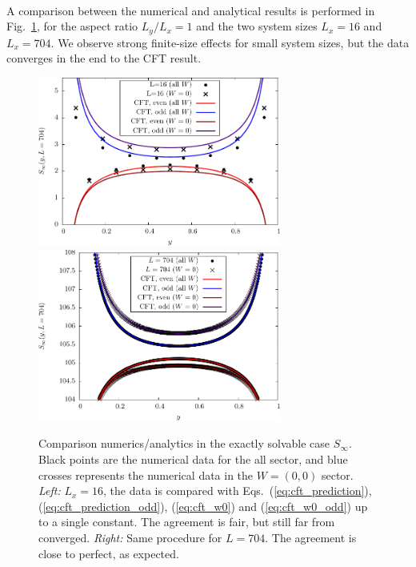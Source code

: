 \documentclass[11pt]{iopart}
\begin{document}
\paragraph{}
A comparison between the numerical and analytical results is performed in Fig.~\ref{fig:Sinfty}, for the aspect ratio $L_y/L_x=1$ and the two system sizes $L_x=16$ and $L_x=704$. We observe strong finite-size effects for small system sizes, but the data converges in the end to the CFT result.
\begin{figure}[ht]
 \begin{center}
  \includegraphics[width=8cm]{./figures/sinfty_16.pdf}
  \includegraphics[width=8cm]{./figures/sinfty_704.pdf}
 \end{center}
\caption{Comparison numerics/analytics in the exactly solvable case $S_\infty$. Black points are the numerical data for the all sector, and blue crosses represents the numerical data in the $W=(0,0)$ sector. \emph{Left:} $L_x=16$, the data is compared with Eqs.~(\ref{eq:cft_prediction}), (\ref{eq:cft_prediction_odd}),  (\ref{eq:cft_w0}) and (\ref{eq:cft_w0_odd}) up to a single constant. The agreement is fair, but still far from converged. \emph{Right:} Same procedure for $L=704$. The agreement is close to perfect, as expected. }
\label{fig:Sinfty}
\end{figure}
\end{document}
